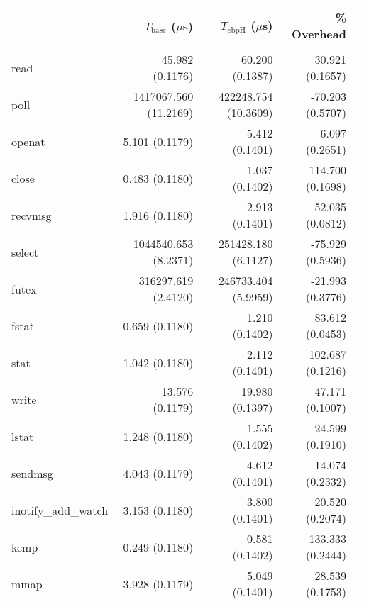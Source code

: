 \begin{longtable}{>{\ttfamily}lrrrr}
\toprule
\multicolumn{1}{l}{System Call} & $T_{\text{base}}$ ($\mu$s) & $T_{\text{ebpH}}$ ($\mu$s) &       \% Overhead \\
\midrule
\endhead
\midrule
\multicolumn{4}{r}{{Continued on next page}} \\
\midrule
\endfoot

\bottomrule
\endlastfoot
                           read &            45.982 (0.1176) &            60.200 (0.1387) &   30.921 (0.1657) \\
                           poll &      1417067.560 (11.2169) &       422248.754 (10.3609) &  -70.203 (0.5707) \\
                         openat &             5.101 (0.1179) &             5.412 (0.1401) &    6.097 (0.2651) \\
                          close &             0.483 (0.1180) &             1.037 (0.1402) &  114.700 (0.1698) \\
                        recvmsg &             1.916 (0.1180) &             2.913 (0.1401) &   52.035 (0.0812) \\
                         select &       1044540.653 (8.2371) &        251428.180 (6.1127) &  -75.929 (0.5936) \\
                          futex &        316297.619 (2.4120) &        246733.404 (5.9959) &  -21.993 (0.3776) \\
                          fstat &             0.659 (0.1180) &             1.210 (0.1402) &   83.612 (0.0453) \\
                           stat &             1.042 (0.1180) &             2.112 (0.1401) &  102.687 (0.1216) \\
                          write &            13.576 (0.1179) &            19.980 (0.1397) &   47.171 (0.1007) \\
                          lstat &             1.248 (0.1180) &             1.555 (0.1402) &   24.599 (0.1910) \\
                        sendmsg &             4.043 (0.1179) &             4.612 (0.1401) &   14.074 (0.2332) \\
            inotify\_add\_watch &             3.153 (0.1180) &             3.800 (0.1401) &   20.520 (0.2074) \\
                           kcmp &             0.249 (0.1180) &             0.581 (0.1402) &  133.333 (0.2444) \\
                           mmap &             3.928 (0.1179) &             5.049 (0.1401) &   28.539 (0.1753) \\

\end{longtable}
